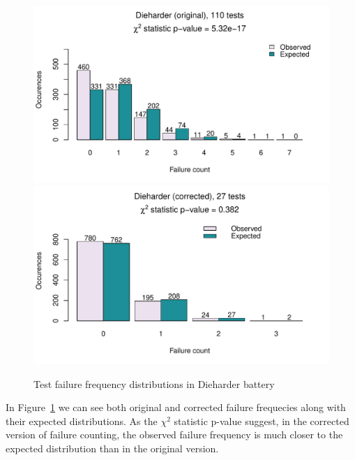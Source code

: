 \documentclass[
  digital,  	%
  color,		%
  oneside,   	%
  12pt,
  nocover,
  notable,
  nolof,
  nolot,
]{fithesis3}
\theoremstyle{definition}
\theoremstyle{remark}
\begin{document}
\begin{figure}[H]
\begin{nomar}
\centering

\includegraphics[width=.42\paperwidth]{figures/dieharder-orig.pdf} 
\includegraphics[width=.42\paperwidth]{figures/dieharder-corr.pdf} 

\end{nomar}
\caption{Test failure frequency distributions in Dieharder battery}
\label{fig:corr_vs_orig_hist}
\end{figure}

In Figure~\ref{fig:corr_vs_orig_hist} we can see both original and corrected failure frequecies along with their expected distributions. As the $\chi^2$ statistic p-value suggest, in the corrected version of failure counting, the observed failure frequency is much closer to the expected distribution than in the original version.
\end{document}
